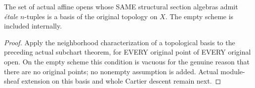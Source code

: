 \begin{corollary}
\label{cor:cartier-original-smooth-etale-affine-basis}
\leanok
The set of actual affine opens whose SAME structural section
algebras admit \emph{\'etale} $n$-tuples is a basis of the original
topology on $X$. The empty scheme is included internally.
\end{corollary}
\begin{proof}
Apply the neighborhood characterization of a topological basis
to the preceding actual subchart theorem, for EVERY original
point of EVERY original open. On the empty scheme this condition
is vacuous for the genuine reason that there are no original
points; no nonempty assumption is added. Actual module-sheaf
extension on this basis and whole Cartier descent remain next.
\end{proof}

